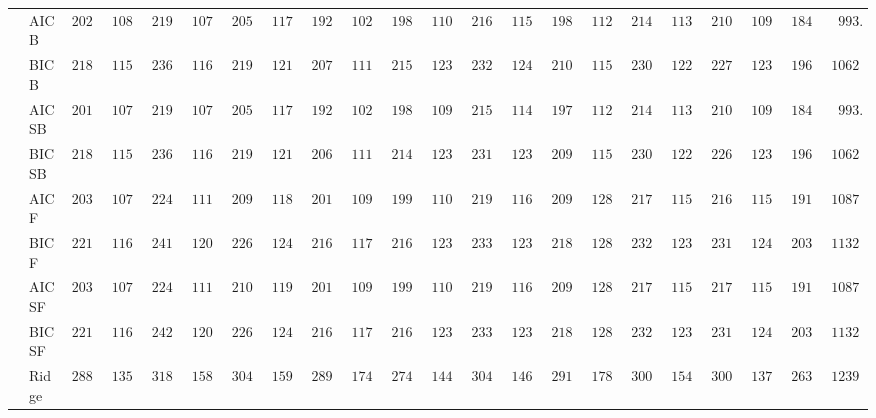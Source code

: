 \begin{tabular}{p{0.2cm}p{1cm}|p{0.6cm}p{0.6cm}|p{0.6cm}p{0.6cm}p{0.6cm}p{0.6cm}p{0.6cm}p{0.6cm}|p{0.6cm}p{0.6cm}p{0.6cm}p{0.6cm}p{0.6cm}p{0.6cm}|p{0.6cm}p{0.6cm}p{0.6cm}p{0.6cm}p{0.6cm}p{0.6cm}}
 & AIC B  & $2020.38$ & $1082.74$ & $2197.58$ & $1078.92$ & $2051.35$ & $1179.20$ & $1922.67$ & $1026.71$ & $1984.03$ & $1104.50$ & $2161.73$ & $1153.92$ & $1980.64$ & $1124.63$ & $2145.73$ & $1133.12$ & $2101.71$ & $1096.03$ & $1847.13$ & $\phantom{0}993.27$ \\
 & BIC B  & $2188.99$ & $1156.36$ & $2369.72$ & $1162.31$ & $2190.12$ & $1210.93$ & $2071.96$ & $1119.25$ & $2150.02$ & $1236.62$ & $2321.75$ & $1249.56$ & $2100.63$ & $1155.00$ & $2309.91$ & $1226.73$ & $2272.28$ & $1233.88$ & $1967.21$ & $1062.66$ \\
 & AIC SB  & $2017.39$ & $1077.21$ & $2197.58$ & $1078.92$ & $2050.88$ & $1178.59$ & $1921.64$ & $1025.53$ & $1980.99$ & $1096.71$ & $2157.83$ & $1149.88$ & $1979.34$ & $1123.34$ & $2142.84$ & $1131.17$ & $2101.71$ & $1096.03$ & $1846.56$ & $\phantom{0}993.65$ \\
 & BIC SB  & $2188.99$ & $1156.36$ & $2369.72$ & $1162.31$ & $2190.12$ & $1210.93$ & $2068.66$ & $1115.90$ & $2148.46$ & $1237.76$ & $2315.87$ & $1236.87$ & $2099.27$ & $1156.20$ & $2306.07$ & $1227.36$ & $2268.56$ & $1233.10$ & $1965.53$ & $1062.55$ \\
 & AIC F  & $2038.74$ & $1075.83$ & $2243.78$ & $1115.76$ & $2098.40$ & $1189.68$ & $2012.68$ & $1095.66$ & $1995.88$ & $1101.20$ & $2194.35$ & $1169.05$ & $2090.45$ & $1283.45$ & $2179.63$ & $1152.23$ & $2165.66$ & $1152.33$ & $1915.58$ & $1087.42$ \\
 & BIC F  & $2214.93$ & $1165.89$ & $2417.29$ & $1205.08$ & $2265.88$ & $1240.92$ & $2164.77$ & $1178.25$ & $2168.97$ & $1233.87$ & $2339.38$ & $1235.98$ & $2182.46$ & $1284.83$ & $2320.72$ & $1231.95$ & $2313.72$ & $1249.85$ & $2032.92$ & $1132.30$ \\
 & AIC SF  & $2039.41$ & $1077.35$ & $2244.43$ & $1115.40$ & $2101.31$ & $1191.36$ & $2014.72$ & $1098.59$ & $1995.85$ & $1101.23$ & $2195.56$ & $1169.31$ & $2094.56$ & $1287.42$ & $2179.86$ & $1152.09$ & $2170.95$ & $1156.95$ & $1916.98$ & $1087.32$ \\
 & BIC SF  & $2215.99$ & $1165.90$ & $2420.57$ & $1205.39$ & $2265.88$ & $1240.92$ & $2166.64$ & $1178.20$ & $2168.97$ & $1233.87$ & $2339.38$ & $1235.98$ & $2184.35$ & $1288.72$ & $2320.72$ & $1231.95$ & $2313.72$ & $1249.85$ & $2032.92$ & $1132.30$ \\
 & Ridge  & $2885.95$ & $1357.52$ & $3182.05$ & $1589.38$ & $3041.98$ & $1591.92$ & $2892.60$ & $1740.08$ & $2745.67$ & $1446.67$ & $3040.68$ & $1461.47$ & $2917.16$ & $1786.44$ & $3000.91$ & $1544.14$ & $3000.55$ & $1379.77$ & $2633.77$ & $1239.07$ \\

\end{tabular}
